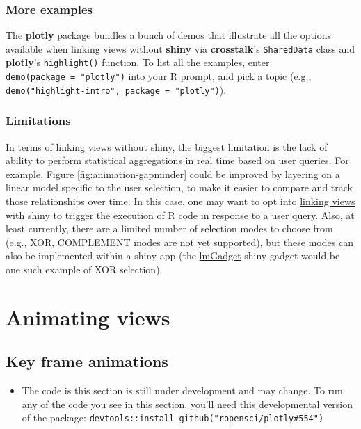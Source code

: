 \documentclass[12pt,]{isuthesis}
\newenvironment{rmdblock}[1]
  {\begin{shaded*}
  \begin{itemize}
  \renewcommand{\labelitemi}{
    \raisebox{-.7\height}[0pt][0pt]{
      {\setkeys{Gin}{width=3em,keepaspectratio}\texttt{[image: images/\#1]}}
    }
  }
  \item
  }
  {
  \end{itemize}
  \end{shaded*}
  }
\newenvironment{rmdwarning}
  {\begin{rmdblock}{warning}}
  {\end{rmdblock}}
\begin{document}
\subsubsection{More examples}\label{more-examples}

The \textbf{plotly} package bundles a bunch of demos that illustrate all
the options available when linking views without \textbf{shiny} via
\textbf{crosstalk}'s \texttt{SharedData} class and \textbf{plotly}'s
\texttt{highlight()} function. To list all the examples, enter
\texttt{demo(package\ =\ "plotly")} into your R prompt, and pick a topic
(e.g., \texttt{demo("highlight-intro",\ package\ =\ "plotly")}).

\subsubsection{Limitations}\label{limitations}

In terms of \protect\hyperlink{linking-views-without-shiny}{linking
views without shiny}, the biggest limitation is the lack of ability to
perform statistical aggregations in real time based on user queries. For
example, Figure \ref{fig:animation-gapminder} could be improved by
layering on a linear model specific to the user selection, to make it
easier to compare and track those relationships over time. In this case,
one may want to opt into
\protect\hyperlink{linking-views-without-shiny}{linking views with
shiny} to trigger the execution of R code in response to a user query.
Also, at least currently, there are a limited number of selection modes
to choose from (e.g., XOR, COMPLEMENT modes are not yet supported), but
these modes can also be implemented within a shiny app (the
\href{https://github.com/ropensci/plotly/blob/cd93ab303efa56007b8bba725bab140e8a8aae39/inst/examples/lmGadget/app.R}{lmGadget}
shiny gadget would be one such example of XOR selection).

\hypertarget{animating-views}{\section{Animating
views}\label{animating-views}}

\subsection{Key frame animations}\label{key-frame-animations}

\begin{rmdwarning}
The code is this section is still under development and may change. To
run any of the code you see in this section, you'll need this
developmental version of the package:
\texttt{devtools::install\_github("ropensci/plotly\#554")}
\end{rmdwarning}
\end{document}

